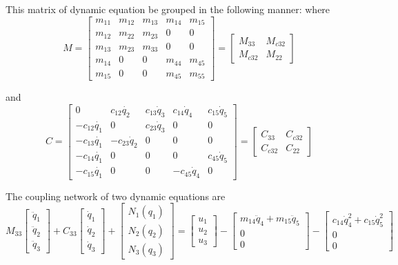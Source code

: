 {This matrix of dynamic equation be grouped in the following manner:
where
\[
M=\left[\begin{array}{ccc|cc}
m_{11} & m_{12} & m_{13} & m_{14} & m_{15}\\
m_{12} & m_{22} & m_{23} & 0 & 0\\
m_{13} & m_{23} & m_{33} & 0 & 0\\ \hline
m_{14} & 0 & 0 & m_{44} & m_{45}\\
m_{15} & 0 & 0 & m_{45} & m_{55}\end{array}\right]
=\left[\begin{array}{cc}
M_{33} & M_{c32}\\
M_{c32} & M_{22}\end{array}\right]
\]

and
\[
C=
\left[\begin{array}{ccc|cc}
0 & c_{12}\dot{q_{2}} & c_{13}\dot{q}_{3} & c_{14}\dot{q}_{4} & c_{15}\dot{q}_{5}\\
-c_{12}\dot{q_{1}} & 0 & c_{23}\dot{q}_{3} & 0 & 0\\
-c_{13}\dot{q_{1}} & -c_{23}\dot{q}_{2} & 0 & 0 & 0\\ \hline
-c_{14}\dot{q_{1}} & 0 & 0 & 0 & c_{45}\dot{q}_{5}\\
-c_{15}\dot{q_{1}} & 0 & 0 & -c_{45}\dot{q}_{4} & 0\end{array}\right]
=\left[\begin{array}{cc}
C_{33} & C_{c32}\\
C_{c32} & C_{22}\end{array}\right]
\]

The coupling network of two dynamic equations are
\[
M_{33}\left[\begin{array}{c}
\ddot{q}_{1}\\
\ddot{q}_{2}\\
\ddot{q}_{3}\end{array}\right]+C_{33}\left[\begin{array}{c}
\dot{q}_{1}\\
\dot{q}_{2}\\
\dot{q}_{3}\end{array}\right]+\left[\begin{array}{c}
N_{1}(q_{1})\\
N_{2}(q_{2})\\
N_{3}(q_{3})\end{array}\right]=\left[\begin{array}{c}
u_{1}\\
u_{2}\\
u_{3}\end{array}\right]-\left[\begin{array}{c}
m_{14}\ddot{q}_{4}+m_{15}\ddot{q}_{5}\\
0\\
0\end{array}\right]-\left[\begin{array}{c}
c_{14}\dot{q}_{4}^{2}+c_{15}\dot{q}_{5}^{2}\\
0\\
0\end{array}\right]
\]

}
